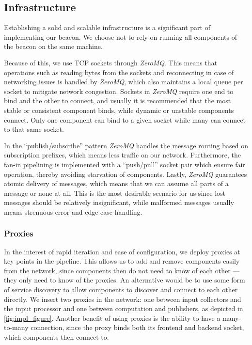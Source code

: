 \subsection{Infrastructure}%
\label{sub:infrastructure}
Establishing a solid and scalable infrastructure is a significant part of implementing our beacon.
We choose not to rely on running all components of the beacon on the same machine.

Because of this, we use TCP sockets through \textit{ZeroMQ}.
This means that operations such as reading bytes from the sockets and reconnecting in case of networking issues is handled by \textit{ZeroMQ}, which also maintains a local queue per socket to mitigate network congestion.
Sockets in \textit{ZeroMQ} require one end to bind and the other to connect, and usually it is recommended that the most stable or consistent component binds, while dynamic or unstable components connect.
Only one component can bind to a given socket while many can connect to that same socket.

In the \enquote{publish/subscribe} pattern \textit{ZeroMQ} handles the message routing based on subscription prefixes, which means less traffic on our network.
Furthermore, the fan-in pipelining is implemented with a \enquote{push/pull} socket pair which ensure fair operation, thereby avoiding starvation of components.
Lastly, \textit{ZeroMQ} guarantees atomic delivery of messages, which means that we can assume all parts of a message or none at all.
This is the most desirable scenario for us since lost messages should be relatively insignificant, while malformed messages usually means strenuous error and edge case handling.

\subsubsection{Proxies}
In the interest of rapid iteration and ease of configuration, we deploy proxies at key points in the pipeline.
This allows us to add and remove components easily from the network, since components then do not need to know of each other --- they only need to know of the proxies.
An alternative would be to use some form of service discovery to allow components to discover and connect to each other directly.
We insert two proxies in the network: one between input collectors and the input processor and one between computation and publishers, as depicted in \vref{fig:impl_figure}.
Another benefit of using proxies is the ability to have a many-to-many connection, since the proxy binds both its frontend and backend socket, which components then connect to.

